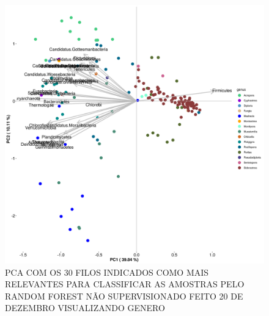 \documentclass[12pt, a4paper]{report}
\begin{document}
\begin{figure}[H]
	\centering
	\includegraphics[scale=0.4]{figures/PCA_rf_nao_super_30_157_corais_genus_2018_12_20.png}
	\caption{PCA COM OS 30 FILOS INDICADOS COMO MAIS RELEVANTES PARA CLASSIFICAR AS AMOSTRAS PELO RANDOM FOREST NÃO SUPERVISIONADO FEITO 20 DE DEZEMBRO VISUALIZANDO GENERO}
	\label{fig: PCA COM OS 30 FILOS INDICADOS COMO MAIS RELEVANTES PARA CLASSIFICAR AS AMOSTRAS PELO RANDOM FOREST NÃO SUPERVISIONADO FEITO 20 DE DEZEMBRO VISUALIZANDO GENERO DE CORAIS}
\end{figure}
\end{document}
